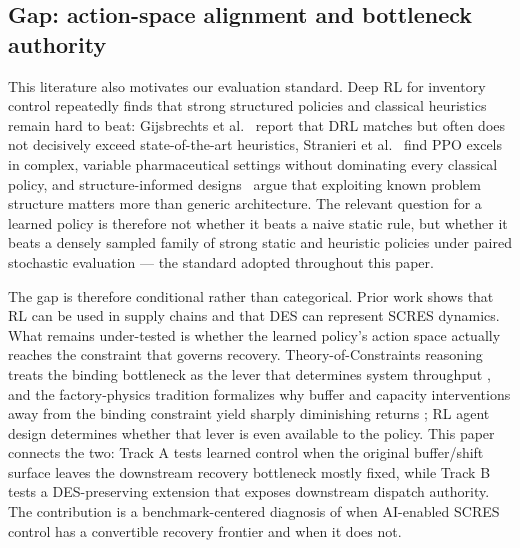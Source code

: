 \hypertarget{25-gap-action-space-alignment}{%
\subsection{Gap: action-space alignment and bottleneck authority}\label{25-gap-action-space-alignment}}

This literature also motivates our evaluation standard. Deep RL for
inventory control repeatedly finds that strong structured policies and
classical heuristics remain hard to beat: Gijsbrechts et
al.~\cite{gijsbrechts2022} report that DRL matches but often does not
decisively exceed state-of-the-art heuristics, Stranieri et
al.~\cite{stranieri2024} find PPO excels in complex, variable
pharmaceutical settings without dominating every classical policy, and
structure-informed designs~\cite{maggiar2025} argue that exploiting known
problem structure matters more than generic architecture. The relevant
question for a learned policy is therefore not whether it beats a naive
static rule, but whether it beats a densely sampled family of strong
static and heuristic policies under paired stochastic evaluation --- the
standard adopted throughout this paper.

The gap is therefore conditional rather than categorical. Prior work
shows that RL can be used in supply chains and that DES can represent
SCRES dynamics. What remains under-tested is whether the learned policy's
action space actually reaches the constraint that governs recovery.
Theory-of-Constraints reasoning treats the binding bottleneck as the
lever that determines system throughput \cite{goldratt1984goal}, and the
factory-physics tradition formalizes why buffer and capacity
interventions away from the binding constraint yield sharply diminishing
returns \cite{hopp2011factory}; RL
agent design determines whether that lever is even available to the
policy. This paper connects the two: Track A tests learned control when
the original buffer/shift surface leaves the downstream recovery
bottleneck mostly fixed, while Track B tests a DES-preserving extension
that exposes downstream dispatch authority. The contribution is a
benchmark-centered diagnosis of when AI-enabled SCRES control has a
convertible recovery frontier and when it does not.
